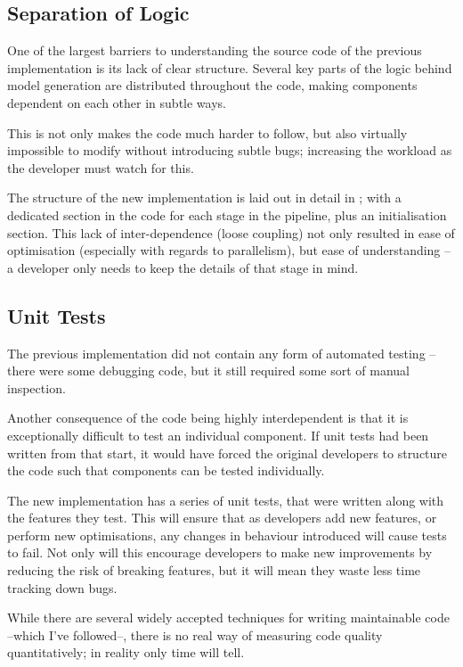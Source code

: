 \leavevmode
\subsection{Separation of Logic}
One of the largest barriers to understanding the source code of the previous implementation is its lack of clear structure. Several key parts of the logic behind model generation are distributed throughout the code, making components dependent on each other in subtle ways. 

This is not only makes the code much harder to follow, but also virtually impossible to modify without introducing subtle bugs; increasing the workload as the developer must watch for this.

The structure of the new implementation is laid out in detail in ; with a dedicated section in the code for each stage in the pipeline, plus an initialisation section. This lack of inter-dependence (loose coupling) not only resulted in ease of optimisation (especially with regards to parallelism), but ease of understanding -- a developer only needs to keep the details of that stage in mind.
	
\subsection{Unit Tests}
The previous implementation did not contain any form of automated testing -- there were some debugging code, but it still required some sort of manual inspection.

Another consequence of the code being highly interdependent is that it is exceptionally difficult to test an individual component. If unit tests had been written from that start, it would have forced the original developers to structure the code such that components can be tested individually.

The new implementation has a series of unit tests, that were written along with the features they test. This will ensure that as developers add new features, or perform new optimisations, any changes in behaviour introduced will cause tests to fail. Not only will this encourage developers to make new improvements by reducing the risk of breaking features, but it will mean they waste less time tracking down bugs.


While there are several widely accepted techniques for writing maintainable code --which I've followed--, there is no real way of measuring code quality quantitatively; in reality only time will tell.
